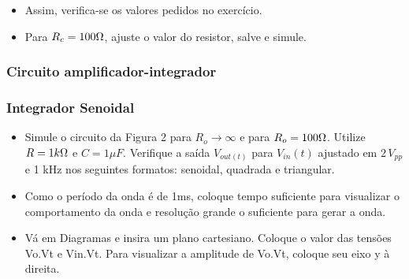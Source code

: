

\begin{itemize}
    \item Assim, verifica-se os valores pedidos no exercício.
\end{itemize}
 

\begin{itemize}
    \item Para $R_c=100\ohm$, ajuste o valor do resistor, salve e simule.
\end{itemize}


\subsubsection{Circuito amplificador-integrador}

\subsubsection{Integrador Senoidal}

\begin{itemize}
    \item Simule o circuito da Figura 2 para $R_o \rightarrow \infty$ e para
    $R_o=100\ohm$. Utilize $R=1k\ohm$ e $C=1\mu F$. Verifique a saída $V_{out(t)}$ para $V_{in}(t)$ ajustado em $2\, V_{pp}$ e 1 kHz nos seguintes formatos: senoidal, quadrada e triangular.
\end{itemize}



\begin{itemize}
    \item Como o período da onda é de 1ms, coloque tempo
    suficiente para visualizar o comportamento da onda
    e resolução grande o suficiente para gerar a onda.
\end{itemize}


\begin{itemize}
    \item Vá em Diagramas e insira um plano cartesiano.
    Coloque o valor das tensões Vo.Vt e Vin.Vt. Para
    visualizar a amplitude de Vo.Vt, coloque seu eixo y à
    direita.
\end{itemize}

